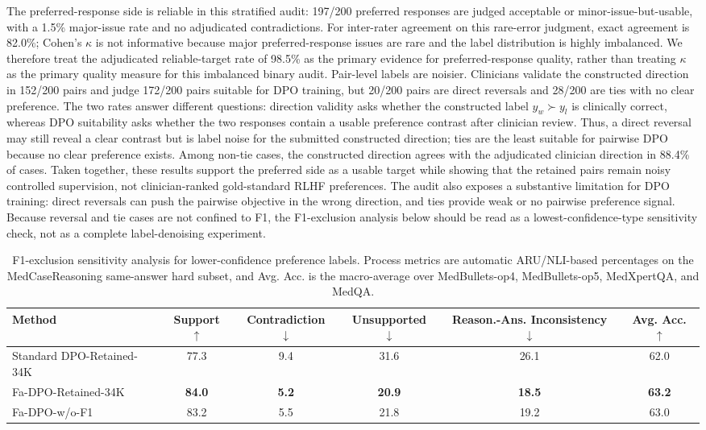 \documentclass[a4paper,fleqn,doubleblind]{cas-sc}
\begin{document}
The preferred-response side is reliable in this stratified audit: 197/200 preferred responses are judged acceptable or minor-issue-but-usable, with a 1.5\% major-issue rate and no adjudicated contradictions. For inter-rater agreement on this rare-error judgment, exact agreement is 82.0\%; Cohen's $\kappa$ is not informative because major preferred-response issues are rare and the label distribution is highly imbalanced. We therefore treat the adjudicated reliable-target rate of 98.5\% as the primary evidence for preferred-response quality, rather than treating $\kappa$ as the primary quality measure for this imbalanced binary audit. Pair-level labels are noisier. Clinicians validate the constructed direction in 152/200 pairs and judge 172/200 pairs suitable for DPO training, but 20/200 pairs are direct reversals and 28/200 are ties with no clear preference. The two rates answer different questions: direction validity asks whether the constructed label $y_w \succ y_l$ is clinically correct, whereas DPO suitability asks whether the two responses contain a usable preference contrast after clinician review. Thus, a direct reversal may still reveal a clear contrast but is label noise for the submitted constructed direction; ties are the least suitable for pairwise DPO because no clear preference exists. Among non-tie cases, the constructed direction agrees with the adjudicated clinician direction in 88.4\% of cases. Taken together, these results support the preferred side as a usable target while showing that the retained pairs remain noisy controlled supervision, not clinician-ranked gold-standard RLHF preferences. The audit also exposes a substantive limitation for DPO training: direct reversals can push the pairwise objective in the wrong direction, and ties provide weak or no pairwise preference signal. Because reversal and tie cases are not confined to F1, the F1-exclusion analysis below should be read as a lowest-confidence-type sensitivity check, not as a complete label-denoising experiment.

\begin{table}[htbp]
    \centering
    \footnotesize
    \caption{F1-exclusion sensitivity analysis for lower-confidence preference labels. Process metrics are automatic ARU/NLI-based percentages on the MedCaseReasoning same-answer hard subset, and Avg. Acc. is the macro-average over MedBullets-op4, MedBullets-op5, MedXpertQA, and MedQA.}
    \label{tab:f1_exclusion_sensitivity}
    \begin{tabular}{lccccc}
        \toprule
        \textbf{Method} & \textbf{Support $\uparrow$} & \textbf{Contradiction $\downarrow$} & \textbf{Unsupported $\downarrow$} & \textbf{Reason.-Ans. Inconsistency $\downarrow$} & \textbf{Avg. Acc. $\uparrow$} \\
        \midrule
        Standard DPO-Retained-34K & 77.3 & 9.4 & 31.6 & 26.1 & 62.0 \\
        Fa-DPO-Retained-34K & \textbf{84.0} & \textbf{5.2} & \textbf{20.9} & \textbf{18.5} & \textbf{63.2} \\
        Fa-DPO-w/o-F1 & 83.2 & 5.5 & 21.8 & 19.2 & 63.0 \\
        \bottomrule
    \end{tabular}
\end{table}
\end{document}
